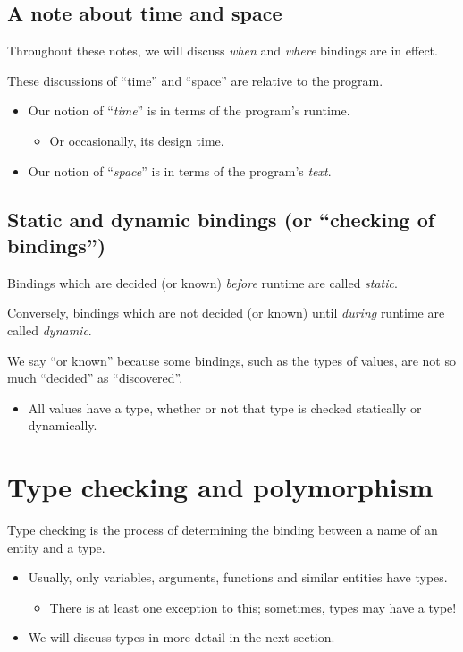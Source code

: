 \documentclass[11pt]{article}
\theoremstyle{definition}
\begin{document}
\subsection{A note about time and space}
\label{sec:org436ecc4}

Throughout these notes, we will discuss \emph{when} and \emph{where} bindings
are in effect.

These discussions of “time” and “space” are relative to the program.
\begin{itemize}
\item Our notion of “\emph{time}” is in terms of the program's runtime.
\begin{itemize}
\item Or occasionally, its design time.
\end{itemize}
\item Our notion of “\emph{space}” is in terms of the program's \emph{text}.
\end{itemize}

\subsection{Static and dynamic bindings (or “checking of bindings”)}
\label{sec:org83846dc}

Bindings which are decided (or known) \emph{before} runtime
are called \emph{static}.

Conversely, bindings which are not decided (or known) until \emph{during} runtime
are called \emph{dynamic}.

We say “or known” because some bindings, such as the types of values,
are not so much “decided” as “discovered”.
\begin{itemize}
\item All values have a type, whether or not that type is checked
statically or dynamically.
\end{itemize}

\section{Type checking and polymorphism}
\label{sec:orgb1a62ed}

Type checking is the process of determining
the binding between a name of an entity and a type.
\begin{itemize}
\item Usually, only variables, arguments, functions and similar entities
have types.
\begin{itemize}
\item There is at least one exception to this;
sometimes, types may have a type!
\end{itemize}
\item We will discuss types in more detail in the next section.
\end{itemize}
\end{document}
